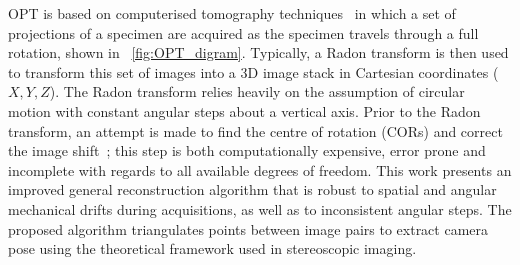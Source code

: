 \documentclass{osa-article}
\begin{document}
OPT is based on computerised tomography techniques~\cite{kakPrinciplesComputerizedTomographic2001} in which a set of projections of a specimen are acquired as the specimen travels through a full rotation, shown in \figurename~\ref{fig:OPT_digram}.
Typically, a Radon transform is then used to transform this set of images into a 3D image stack in Cartesian coordinates (\( X,Y,Z \)).
The Radon transform relies heavily on the assumption of circular motion with constant angular steps about a vertical axis.
Prior to the Radon transform, an attempt is made to find the centre of rotation (CORs) and correct the image shift~\cite{dongAutomatedRecoveryCenter2013,arranzHelicalOpticalProjection2013,zhangZOPTOpenSource2020}; this step is both computationally expensive, error prone and incomplete with regards to all available degrees of freedom.
This work presents an improved general reconstruction algorithm that is robust to spatial and angular mechanical drifts during acquisitions, as well as to inconsistent angular steps.
The proposed algorithm triangulates points between image pairs to extract camera pose using the theoretical framework used in stereoscopic imaging. %
%
\end{document}
